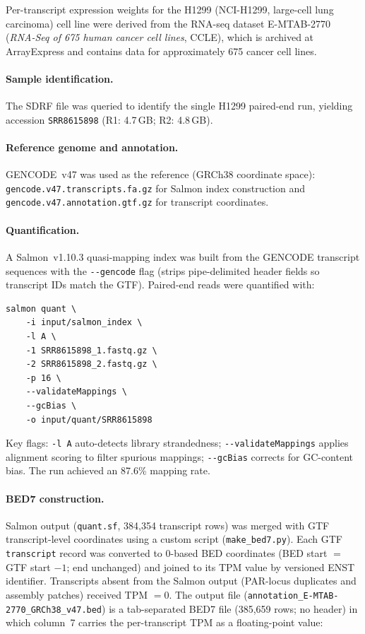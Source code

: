\documentclass[11pt]{article}
\begin{document}
Per-transcript expression weights for the H1299 (NCI-H1299, large-cell lung carcinoma) cell line were derived from the RNA-seq dataset E-MTAB-2770 (\textit{RNA-Seq of 675 human cancer cell lines}, CCLE), which is archived at ArrayExpress and contains data for approximately 675 cancer cell lines.

\paragraph{Sample identification.}
The SDRF file was queried to identify the single H1299 paired-end run, yielding accession \texttt{SRR8615898} (R1: 4.7\,GB; R2: 4.8\,GB).

\paragraph{Reference genome and annotation.}
GENCODE~v47 was used as the reference (GRCh38 coordinate space): \texttt{gencode.v47.transcripts.fa.gz} for Salmon index construction and \texttt{gencode.v47.annotation.gtf.gz} for transcript coordinates.

\paragraph{Quantification.}
A Salmon~v1.10.3 quasi-mapping index was built from the GENCODE transcript sequences with the \texttt{-{}-gencode} flag (strips pipe-delimited header fields so transcript IDs match the GTF).
Paired-end reads were quantified with:

\begin{verbatim}
salmon quant \
    -i input/salmon_index \
    -l A \
    -1 SRR8615898_1.fastq.gz \
    -2 SRR8615898_2.fastq.gz \
    -p 16 \
    --validateMappings \
    --gcBias \
    -o input/quant/SRR8615898
\end{verbatim}

\noindent Key flags: \texttt{-l~A} auto-detects library strandedness; \texttt{-{}-validateMappings} applies alignment scoring to filter spurious mappings; \texttt{-{}-gcBias} corrects for GC-content bias.
The run achieved an 87.6\% mapping rate.

\paragraph{BED7 construction.}
Salmon output (\texttt{quant.sf}, 384{,}354 transcript rows) was merged with GTF transcript-level coordinates using a custom script (\texttt{make\_bed7.py}).
Each GTF \texttt{transcript} record was converted to 0-based BED coordinates (BED start $=$ GTF start $- 1$; end unchanged) and joined to its TPM value by versioned ENST identifier.
Transcripts absent from the Salmon output (PAR-locus duplicates and assembly patches) received TPM $= 0$.
The output file (\texttt{annotation\_E-MTAB-2770\_GRCh38\_v47.bed}) is a tab-separated BED7 file (385{,}659 rows; no header) in which column~7 carries the per-transcript TPM as a floating-point value:
\end{document}

